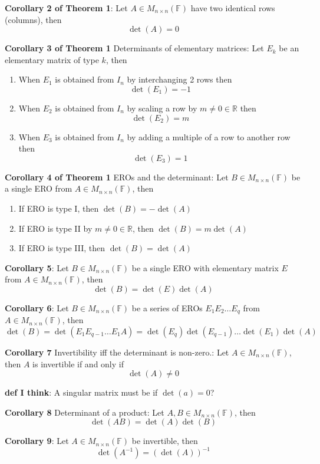 \documentclass[11pt,notitlepage]{report}
\newcommand{\bb}[1]{\ensuremath{\mathbb{#1}}}
\begin{document}
\textbf{Corollary 2 of Theorem 1}: Let $A \in M_{n \times n}(\bb F)$ have two identical rows (columns), then
$$\det(A) = 0$$

\textbf{Corollary 3 of Theorem 1} Determinants of elementary matrices: Let $E_k$ be an elementary matrix of type $k$, then
\begin{enumerate}[label=\roman*)]
    \item When $E_1$ is obtained from $I_n$ by interchanging 2 rows then $$\det(E_1) = -1$$
    \item When $E_2$ is obtained from $I_n$ by scaling a row by $m \ne 0 \in \bb R$ then $$\det(E_2) = m$$
    \item When $E_3$ is obtained from $I_n$ by adding a multiple of a row to another row then $$\det(E_3) = 1$$
\end{enumerate}

\textbf{Corollary 4 of Theorem 1} EROs and the determinant: Let $B \in M_{n \times n}(\bb F)$ be a single ERO from $A \in M_{n \times n}(\bb F)$, then
\begin{enumerate}[label=\roman*)]
    \item If ERO is type I, then $\det(B) = -\det(A)$
    \item If ERO is type II by $m \ne 0 \in \bb R$, then $\det(B) = m\det(A)$
    \item If ERO is type III, then $\det(B) = \det(A)$
\end{enumerate}

\textbf{Corollary 5}: Let $B \in M_{n \times n}(\bb F)$ be a single ERO with elementary matrix $E$ from $A \in M_{n \times n}(\bb F)$, then
$$\det(B) = \det(E)\det(A)$$

\textbf{Corollary 6}: Let $B \in M_{n \times n}(\bb F)$ be a series of EROs $E_1E_2\dots E_q$ from $A \in M_{n \times n}(\bb F)$, then
$$\det(B) = \det(E_1E_{q-1} \dots E_1 A) = \det(E_q)\det(E_{q-1})\dots\det(E_1)\det(A)$$

\textbf{Corollary 7} Invertibility iff the determinant is non-zero.: Let $A \in M_{n \times n}(\bb F)$, then $A$ is invertible if and only if
$$\det(A) \ne 0$$

\textbf{def I think}: A singular matrix must be if $\det(a) = 0$?

\textbf{Corollary 8} Determinant of a product: Let $A, B \in M_{n \times n}(\bb F)$, then 
$$\det(AB) = \det(A)\det(B)$$

\textbf{Corollary 9}: Let $A \in M_{n \times n}(\bb F)$ be invertible, then 
$$\det(A^{-1}) = (\det(A))^{-1}$$
\end{document}

